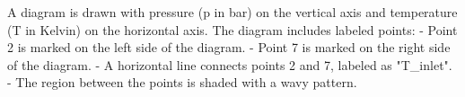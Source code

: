 A diagram is drawn with pressure (p in bar) on the vertical axis and temperature (T in Kelvin) on the horizontal axis. The diagram includes labeled points:  
- Point 2 is marked on the left side of the diagram.  
- Point 7 is marked on the right side of the diagram.  
- A horizontal line connects points 2 and 7, labeled as "T_inlet".  
- The region between the points is shaded with a wavy pattern.
